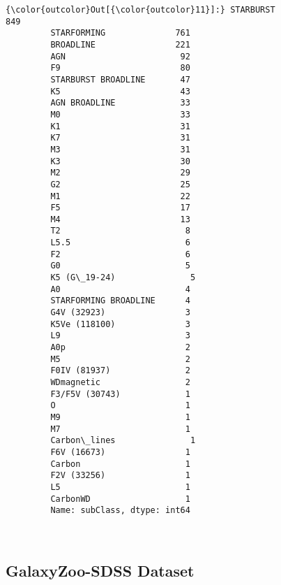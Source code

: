\documentclass[11pt]{article}
\begin{document}
\begin{Verbatim}[commandchars=\\\{\}]
{\color{outcolor}Out[{\color{outcolor}11}]:} STARBURST                849
         STARFORMING              761
         BROADLINE                221
         AGN                       92
         F9                        80
         STARBURST BROADLINE       47
         K5                        43
         AGN BROADLINE             33
         M0                        33
         K1                        31
         K7                        31
         M3                        31
         K3                        30
         M2                        29
         G2                        25
         M1                        22
         F5                        17
         M4                        13
         T2                         8
         L5.5                       6
         F2                         6
         G0                         5
         K5 (G\_19-24)               5
         A0                         4
         STARFORMING BROADLINE      4
         G4V (32923)                3
         K5Ve (118100)              3
         L9                         3
         A0p                        2
         M5                         2
         F0IV (81937)               2
         WDmagnetic                 2
         F3/F5V (30743)             1
         O                          1
         M9                         1
         M7                         1
         Carbon\_lines               1
         F6V (16673)                1
         Carbon                     1
         F2V (33256)                1
         L5                         1
         CarbonWD                   1
         Name: subClass, dtype: int64
\end{Verbatim}
            
    \begin{center}
    \end{center}
    { \hspace*{\fill} \\}
    
    \subsection{GalaxyZoo-SDSS Dataset}\label{galaxyzoo-sdss-dataset}
\end{document}
